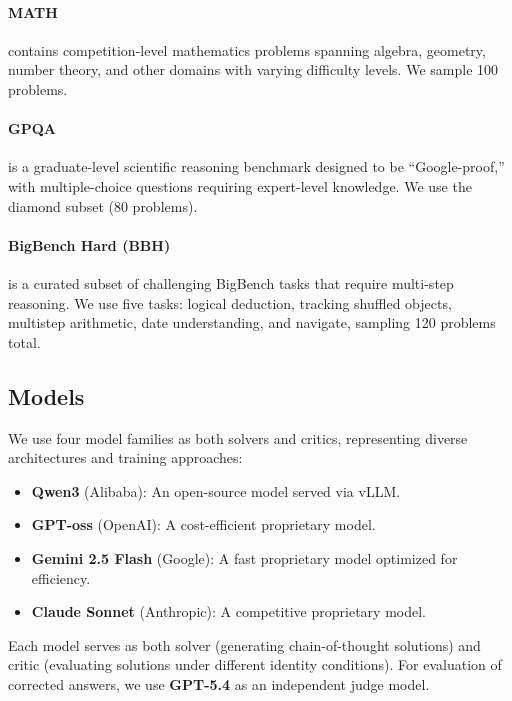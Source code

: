 \documentclass[11pt]{article}
\begin{document}
\paragraph{MATH} \citep{hendrycks2021math} contains competition-level mathematics problems spanning algebra, geometry, number theory, and other domains with varying difficulty levels. We sample 100 problems.

\paragraph{GPQA} \citep{rein2023gpqa} is a graduate-level scientific reasoning benchmark designed to be ``Google-proof,'' with multiple-choice questions requiring expert-level knowledge. We use the diamond subset (80 problems).

\paragraph{BigBench Hard (BBH)} is a curated subset of challenging BigBench tasks that require multi-step reasoning. We use five tasks: logical deduction, tracking shuffled objects, multistep arithmetic, date understanding, and navigate, sampling 120 problems total.

\subsection{Models}
\label{sec:models}

We use four model families as both solvers and critics, representing diverse architectures and training approaches:

\begin{itemize}
    \item \textbf{Qwen3} (Alibaba): An open-source model served via vLLM.
    \item \textbf{GPT-oss} (OpenAI): A cost-efficient proprietary model.
    \item \textbf{Gemini 2.5 Flash} (Google): A fast proprietary model optimized for efficiency.
    \item \textbf{Claude Sonnet} (Anthropic): A competitive proprietary model.
\end{itemize}

Each model serves as both solver (generating chain-of-thought solutions) and critic (evaluating solutions under different identity conditions). For evaluation of corrected answers, we use \textbf{GPT-5.4} as an independent judge model.
\end{document}
